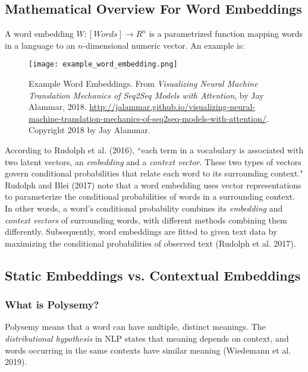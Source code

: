 \subsection{Mathematical Overview For Word Embeddings}
 
A word embedding $W: [Words] \rightarrow R^n$ is a parametrized function mapping words in a language to an $n$-dimensional numeric vector. An example is: 

\begin{figure}[h]
\vspace{-10pt}
\centering
\texttt{[image: example\_word\_embedding.png]}
\vspace{-10pt}
\caption{\footnotesize Example Word Embeddings. From \emph{Visualizing Neural Machine Translation Mechanics of Seq2Seq Models with Attention}, by Jay Alammar, 2018. \url{http://jalammar.github.io/visualizing-neural-machine-translation-mechanics-of-seq2seq-models-with-attention/}. Copyright 2018 by Jay Alammar.}
\vspace{-10pt}
\end{figure}

According to Rudolph et al. (2016), ``each term in a vocabulary is associated with two latent vectors, an \emph{embedding} and a \emph{context vector}. These two types of vectors govern conditional probabilities that relate each word to its surrounding context." 
Rudolph and Blei (2017) note that a word embedding uses vector representations to parameterize the conditional probabilities of words in a surrounding context. 
In other words, a word's conditional probability combines its \emph{embedding} and \emph{context vectors} of surrounding words, with different methods combining them differently. Subsequently, word embeddings are fitted to given text data by maximizing the conditional probabilities of observed text (Rudolph et al. 2017). 

\subsection{Static Embeddings vs. Contextual Embeddings}

\subsubsection{What is Polysemy?}

Polysemy means that a word can have multiple, distinct meanings. The \emph{distributional hypothesis} in NLP states that meaning depends on context, and words occurring in the same contexts have similar meaning (Wiedemann et al. 2019). 

